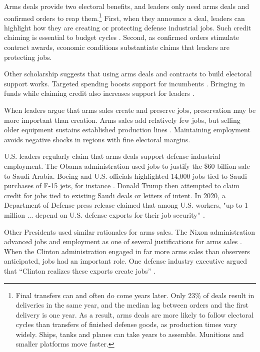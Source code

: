 \documentclass[12pt]{article}
\begin{document}
Arms deals provide two electoral benefits, and leaders only need arms deals and confirmed orders to reap them.\footnote{Final transfers can and often do come years later. 
Only 23\% of deals result in deliveries in the same year, and the median lag between orders and the first delivery is one year. 
As a result, arms deals are more likely to follow electoral cycles than transfers of finished defense goods, as production times vary widely. 
Ships, tanks and planes can take years to assemble.
Munitions and smaller platforms move faster.}
First, when they announce a deal, leaders can highlight how they are creating or protecting defense industrial jobs. 
Such credit claiming is essential to budget cycles \citep{Bueno2021}. 
Second, as confirmed orders stimulate contract awards, economic conditions substantiate claims that leaders are protecting jobs. 


Other scholarship suggests that using arms deals and contracts to build electoral support works. 
Targeted spending boosts support for incumbents \citep{KrinerReeves2012}.
Bringing in funds while claiming credit also increases support for leaders \citep{Grimmeretal2012}. 


When leaders argue that arms sales create and preserve jobs, preservation may be more important than creation. 
Arms sales add relatively few jobs, but selling older equipment sustains established production lines \citep{Caverley2018}. 
Maintaining employment avoids negative shocks in regions with fine electoral margins. 


U.S. leaders regularly claim that arms deals support defense industrial employment. 
The Obama administration used jobs to justify the \$60 billion sale to Saudi Arabia.
Boeing and U.S. officials highlighted 14,000 jobs tied to Saudi purchases of F-15 jets, for instance \citep{hillsaudisale2010}.
Donald Trump then attempted to claim credit for jobs tied to existing Saudi deals or letters of intent. 
In 2020, a Department of Defense press release claimed that among U.S. workers, "up to 1 million ... depend on U.S. defense exports for their job security'' \citep{dodarmsjobs2020}. 


Other Presidents used similar rationales for arms sales.
The Nixon administration advanced jobs and employment as one of several justifications for arms sales \citep[pg. 34]{Sorley1983}. 
When the Clinton administration engaged in far more arms sales than observers anticipated, jobs had an important role.
One defense industry executive argued that ``Clinton realizes these exports create jobs'' \citep{clintonarms1993}.
\end{document}
